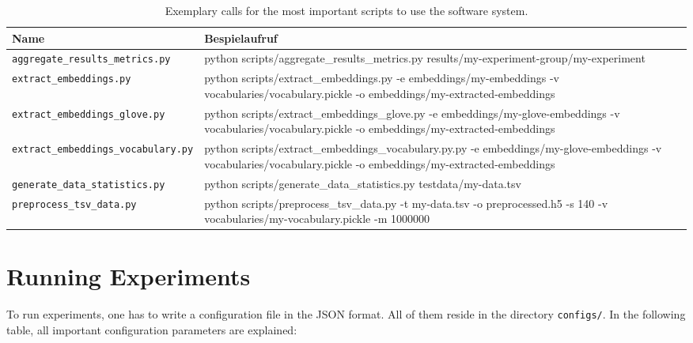 \begin{table}[H]
	\centering
	\begin{adjustbox}{max width=\textwidth}
		\begin{tabular}{lp{20cm}}
			\toprule
			Name & Bespielaufruf\\ \midrule
			\texttt{aggregate{\_}results{\_}metrics.py} & python scripts/aggregate{\_}results{\_}metrics.py results/my-experiment-group/my-experiment\\
			\texttt{extract{\_}embeddings.py} & python scripts/extract{\_}embeddings.py -e embeddings/my-embeddings -v vocabularies/vocabulary.pickle -o embeddings/my-extracted-embeddings\\
			\texttt{extract{\_}embeddings{\_}glove.py} & python scripts/extract{\_}embeddings{\_}glove.py -e embeddings/my-glove-embeddings -v vocabularies/vocabulary.pickle -o embeddings/my-extracted-embeddings\\
			\texttt{extract{\_}embeddings{\_}vocabulary.py} & python scripts/extract{\_}embeddings{\_}vocabulary.py.py -e embeddings/my-glove-embeddings -v vocabularies/vocabulary.pickle -o embeddings/my-extracted-embeddings\\
			\texttt{generate{\_}data{\_}statistics.py} & python scripts/generate{\_}data{\_}statistics.py testdata/my-data.tsv\\
			\texttt{preprocess{\_}tsv{\_}data.py} & python scripts/preprocess{\_}tsv{\_}data.py -t my-data.tsv -o preprocessed.h5 -s 140 -v vocabularies/my-vocabulary.pickle -m 1000000\\
			\bottomrule
		\end{tabular}
	\end{adjustbox}
	\caption{Exemplary calls for the most important scripts to use the software system.}
\end{table}

\clearpage

\section{Running Experiments}
To run experiments, one has to write a configuration file in the JSON format. All of them reside in the directory \texttt{configs/}. In the following table, all important configuration parameters are explained:

